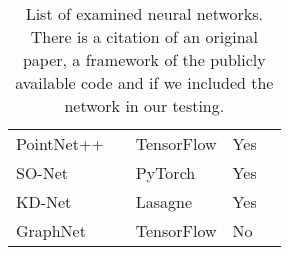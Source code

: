 \begin{table}[]
\begin{tabular}{lllll}
		PointNet++             & \cite{qi_pointnet++:_2017}               & TensorFlow         & Yes               &  \\
		SO-Net                 & \cite{li_so-net:_2018}                   & PyTorch            & Yes               &  \\
		KD-Net                 & \cite{klokov_escape_2017}                & Lasagne            & Yes               &  \\
		GraphNet               & \cite{dominguez_general-purpose_2018}    & TensorFlow         & No                &
	\end{tabular}
\caption{List of examined neural networks. There is a citation of an original paper, a framework of the publicly available code and if we included the network in our testing.}
\label{Table:1}
\end{table}